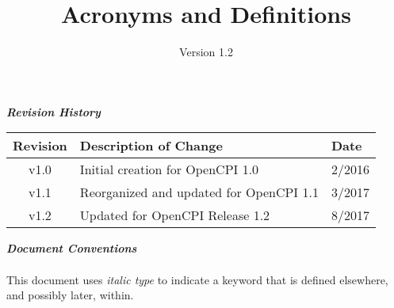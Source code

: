 \iffalse
This file is protected by Copyright. Please refer to the COPYRIGHT file
distributed with this source distribution.

This file is part of OpenCPI <http://www.opencpi.org>

OpenCPI is free software: you can redistribute it and/or modify it under the
terms of the GNU Lesser General Public License as published by the Free Software
Foundation, either version 3 of the License, or (at your option) any later
version.

OpenCPI is distributed in the hope that it will be useful, but WITHOUT ANY
WARRANTY; without even the implied warranty of MERCHANTABILITY or FITNESS FOR A
PARTICULAR PURPOSE. See the GNU Lesser General Public License for more details.

You should have received a copy of the GNU Lesser General Public License along
with this program. If not, see <http://www.gnu.org/licenses/>.
\fi
\def\docTitle{Acronyms and Definitions}
\def\docVersion{1.2}

\date{Version \docVersion} %
\title{\docTitle}
\lhead{\small{\docTitle}}
\usepackage{enumitem}

\maketitle
\thispagestyle{fancy}
\newpage
\begin{center}
  \textit{\textbf{Revision History}}
  \begin{table}[H]
    \begin{tabularx}{\textwidth}{|c|X|l|}
      \hline
      \rowcolor{blue}
      \textbf{Revision} & \textbf{Description of Change} & \textbf{Date} \\
      \hline
      v1.0 & Initial creation for OpenCPI 1.0 & 2/2016 \\
      \hline
      v1.1 & Reorganized and updated for OpenCPI 1.1 & 3/2017 \\
      \hline
      v1.2 & Updated for OpenCPI Release 1.2 & 8/2017 \\
      \hline
    \end{tabularx}
  \end{table}
  \par
  \textit{\textbf{Document Conventions}}\\
  ~\\
  This document uses \textit{italic type} to indicate a keyword that is defined elsewhere, and possibly later, within.
\end{center}
\newpage
